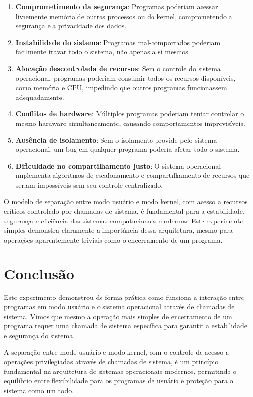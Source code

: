\documentclass[12pt,a4paper]{article}
\begin{document}
\begin{enumerate}
    \item \textbf{Comprometimento da segurança}: Programas poderiam acessar livremente memória de outros processos ou do kernel, comprometendo a segurança e a privacidade dos dados.
    
    \item \textbf{Instabilidade do sistema}: Programas mal-comportados poderiam facilmente travar todo o sistema, não apenas a si mesmos.
    
    \item \textbf{Alocação descontrolada de recursos}: Sem o controle do sistema operacional, programas poderiam consumir todos os recursos disponíveis, como memória e CPU, impedindo que outros programas funcionassem adequadamente.
    
    \item \textbf{Conflitos de hardware}: Múltiplos programas poderiam tentar controlar o mesmo hardware simultaneamente, causando comportamentos imprevisíveis.
    
    \item \textbf{Ausência de isolamento}: Sem o isolamento provido pelo sistema operacional, um bug em qualquer programa poderia afetar todo o sistema.
    
    \item \textbf{Dificuldade no compartilhamento justo}: O sistema operacional implementa algoritmos de escalonamento e compartilhamento de recursos que seriam impossíveis sem seu controle centralizado.
\end{enumerate}

O modelo de separação entre modo usuário e modo kernel, com acesso a recursos críticos controlado por chamadas de sistema, é fundamental para a estabilidade, segurança e eficiência dos sistemas computacionais modernos. Este experimento simples demonstra claramente a importância dessa arquitetura, mesmo para operações aparentemente triviais como o encerramento de um programa.

\section{Conclusão}

Este experimento demonstrou de forma prática como funciona a interação entre programas em modo usuário e o sistema operacional através de chamadas de sistema. Vimos que mesmo a operação mais simples de encerramento de um programa requer uma chamada de sistema específica para garantir a estabilidade e segurança do sistema.

A separação entre modo usuário e modo kernel, com o controle de acesso a operações privilegiadas através de chamadas de sistema, é um princípio fundamental na arquitetura de sistemas operacionais modernos, permitindo o equilíbrio entre flexibilidade para os programas de usuário e proteção para o sistema como um todo.
\end{document}
